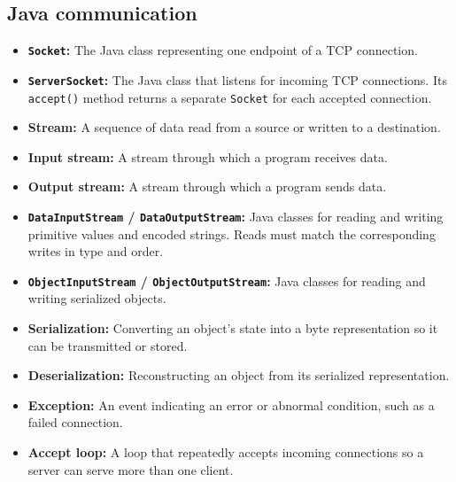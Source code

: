 \documentclass[11pt]{article}
\newenvironment{DottedList}{%
  \begin{itemize}[leftmargin=2em, itemsep=0.35em, topsep=0.35em, label=\textbullet]
}{%
  \end{itemize}
}
\begin{document}
\subsection*{Java communication}
\begin{DottedList}
  \item \textbf{\texttt{Socket}:} The Java class representing one endpoint of a TCP connection.
  \item \textbf{\texttt{ServerSocket}:} The Java class that listens for incoming TCP connections. Its \texttt{accept()} method returns a separate \texttt{Socket} for each accepted connection.
  \item \textbf{Stream:} A sequence of data read from a source or written to a destination.
  \item \textbf{Input stream:} A stream through which a program receives data.
  \item \textbf{Output stream:} A stream through which a program sends data.
  \item \textbf{\texttt{DataInputStream} / \texttt{DataOutputStream}:} Java classes for reading and writing primitive values and encoded strings. Reads must match the corresponding writes in type and order.
  \item \textbf{\texttt{ObjectInputStream} / \texttt{ObjectOutputStream}:} Java classes for reading and writing serialized objects.
  \item \textbf{Serialization:} Converting an object's state into a byte representation so it can be transmitted or stored.
  \item \textbf{Deserialization:} Reconstructing an object from its serialized representation.
  \item \textbf{Exception:} An event indicating an error or abnormal condition, such as a failed connection.
  \item \textbf{Accept loop:} A loop that repeatedly accepts incoming connections so a server can serve more than one client.
\end{DottedList}
\end{document}
